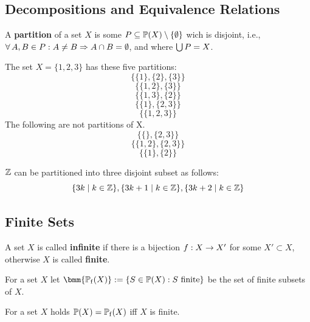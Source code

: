 \documentclass[12pt]{book}
\begin{document}
\subsection{Decompositions and Equivalence Relations}
\label{sec:Decompositions}

\begin{defi}\label{def:Decompositions}
      A \textbf{partition} of a set $X$ is some $P \subseteq \operatorname{\mathbb{P}}(X) \setminus \{ \emptyset \}$ wich is disjoint, i.e., $\forall\, A, B \in P : A \ne B \Rightarrow A \cap B = \emptyset$, 
	  and where $\bigcup P = X$.
\end{defi}
\begin{examp}\label{exp:Decompositions}
      The set $X = \{ 1, 2, 3 \} $ has these five partitions:
      $$ \{ \{1\}, \{2\}, \{3\}\}$$
      $$ \{ \{1,2\}, \{3\}\}$$
      $$ \{ \{1, 3\}, \{2\}\}$$
      $$ \{ \{1\}, \{2, 3\}\}$$
      $$ \{ \{ 1, 2, 3 \}\}$$
      The following are not partitions of X.
      $$ \{ \{\}, \{2, 3\}\}$$
      $$ \{ \{1, 2\}, \{2, 3\}\}$$
      $$ \{ \{1\}, \{2\}\}$$
\end{examp}

\begin{examp}\label{exp:partition}
      $\mathbb{Z}$ can be partitioned into three disjoint subset as follows:
	  $$ \{3k \mid k \in \mathbb{Z}\}, \{3k+1 \mid k \in \mathbb{Z}\}, \{3k+2 \mid k \in \mathbb{Z}\}$$
\end{examp}
\subsection{Finite Sets}
\label{sec:Finite sets}

\begin{defi}\label{def:finite}
      A set $X$ is called \textbf{infinite} if there is a bijection $f: X \rightarrow X'$ for some $X' \subset X$, otherwise $X$ is called \textbf{finite}.
\end{defi}
\begin{defi}\label{def:finitesubs}
      For a set $X$ let $\bmm{\pote(X)} := \set{S \in \pot(X) : S \text{ finite}}$ be the set of finite subsets of $X$.
\end{defi}
\begin{lem}\label{lem:finitesubs}
      For a set $X$ holds $\operatorname{\mathbb{P}}(X) = \operatorname{\mathbb{P}_f}(X)$ iff $X$ is finite.
\end{lem}
\end{document}
